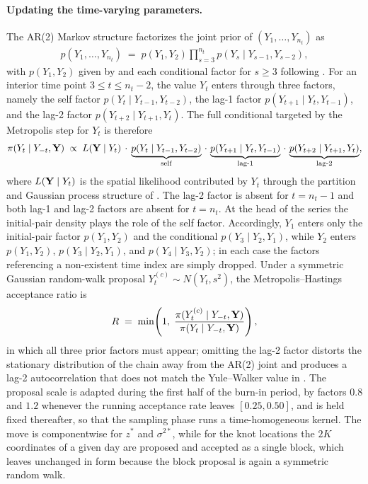 \documentclass[12pt]{article}
\begin{document}
\paragraph{Updating the time-varying parameters.}
The AR(2) Markov structure factorizes the joint prior of $(Y_1, \ldots, Y_{n_t})$ as
\begin{align}
  p(Y_1, \ldots, Y_{n_t})
  \;=\; p(Y_1, Y_2) \prod_{s = 3}^{n_t} p(Y_s \mid Y_{s-1}, Y_{s-2}), \label{eq:joint-prior}
\end{align}
with $p(Y_1, Y_2)$ given by  and each conditional factor for $s \ge 3$ following .  For an interior time point $3 \le t \le n_t - 2$, the value $Y_t$ enters  through three factors, namely the self factor $p(Y_t \mid Y_{t-1}, Y_{t-2})$, the lag-1 factor $p(Y_{t+1} \mid Y_t, Y_{t-1})$, and the lag-2 factor $p(Y_{t+2} \mid Y_{t+1}, Y_t)$.  The full conditional targeted by the Metropolis step for $Y_t$ is therefore
\begin{align}
  \pi(Y_t \mid Y_{-t}, \mbox{\bf Y})
  \;\propto\;
  L(\mbox{\bf Y} \mid Y_t) \,\cdot\,
  \underbrace{p(Y_t \mid Y_{t-1}, Y_{t-2})}_{\text{self}}
  \,\cdot\,
  \underbrace{p(Y_{t+1} \mid Y_t, Y_{t-1})}_{\text{lag-1}}
  \,\cdot\,
  \underbrace{p(Y_{t+2} \mid Y_{t+1}, Y_t)}_{\text{lag-2}}, \label{eq:full-cond}
\end{align}
where $L(\mbox{\bf Y} \mid Y_t)$ is the spatial likelihood contributed by $Y_t$ through the partition and Gaussian process structure of .  The lag-2 factor is absent for $t = n_t - 1$ and both lag-1 and lag-2 factors are absent for $t = n_t$.  At the head of the series the initial-pair density  plays the role of the self factor.  Accordingly, $Y_1$ enters only the initial-pair factor $p(Y_1, Y_2)$ and the conditional $p(Y_3 \mid Y_2, Y_1)$, while $Y_2$ enters $p(Y_1, Y_2)$, $p(Y_3 \mid Y_2, Y_1)$, and $p(Y_4 \mid Y_3, Y_2)$; in each case the factors referencing a non-existent time index are simply dropped.  Under a symmetric Gaussian random-walk proposal $Y_t^{(c)} \sim N(Y_t, s^2)$, the Metropolis--Hastings acceptance ratio is
\begin{align}
  R \;=\; \min\!\left(1,\; \frac{\pi(Y_t^{(c)} \mid Y_{-t}, \mbox{\bf Y})}{\pi(Y_t \mid Y_{-t}, \mbox{\bf Y})}\right), \label{eq:mh-ratio}
\end{align}
in which all three prior factors must appear; omitting the lag-2 factor distorts the stationary distribution of the chain away from the AR(2) joint and produces a lag-2 autocorrelation that does not match the Yule--Walker value in .  The proposal scale is adapted during the first half of the burn-in period, by factors $0.8$ and $1.2$ whenever the running acceptance rate leaves $[0.25, 0.50]$, and is held fixed thereafter, so that the sampling phase runs a time-homogeneous kernel.  The move is componentwise for $z^*$ and $\sigma^{2*}$, while for the knot locations the $2K$ coordinates of a given day are proposed and accepted as a single block, which leaves  unchanged in form because the block proposal is again a symmetric random walk.
\end{document}
